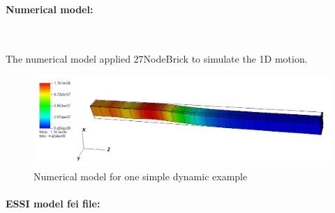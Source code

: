 \paragraph{Numerical model:} ~

The numerical model applied 27NodeBrick to simulate the 1D motion. 

\begin{figure}[!htb]
  \centering
  \includegraphics[width=16cm]{./Figure-files/_Chapter_Appendix_Illustrative_Examples/dynamic_example_numerical.pdf}
  \caption{Numerical model for one simple dynamic example}
  \label{fig Numerical model for one simple dynamic example}
\end{figure}

\paragraph{ESSI model fei file: } ~

